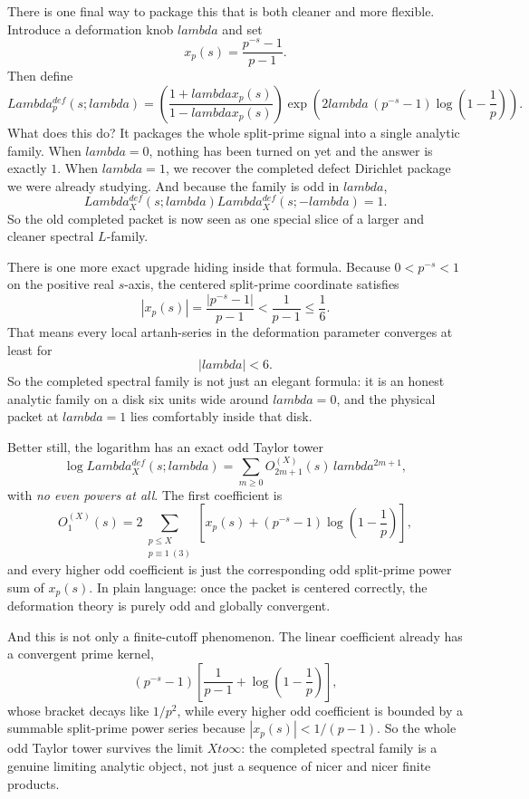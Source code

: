 \documentclass[11pt]{article}
\def\mathrm#1{#1}%
\def\mathcal#1{#1}%
\def\lambda{lambda}%
\def\Lambda{Lambda}%
\def\to{ to }%
\begin{document}
There is one final way to package this that is both cleaner and more flexible. Introduce a deformation knob $\lambda$ and set
\[
x_p(s)=\frac{p^{-s}-1}{p-1}.
\]
Then define
\[
\Lambda_p^{\mathrm{def}}(s;\lambda)
=
\left(\frac{1+\lambda x_p(s)}{1-\lambda x_p(s)}\right)
\exp\!\left(2\lambda\,(p^{-s}-1)\log\!\left(1-\frac1p\right)\right).
\]
What does this do? It packages the whole split-prime signal into a single analytic family. When $\lambda=0$, nothing has been turned on yet and the answer is exactly $1$. When $\lambda=1$, we recover the completed defect Dirichlet package we were already studying. And because the family is odd in $\lambda$,
\[
\Lambda_X^{\mathrm{def}}(s;\lambda)\Lambda_X^{\mathrm{def}}(s;-\lambda)=1.
\]
So the old completed packet is now seen as one special slice of a larger and cleaner spectral $L$-family.

There is one more exact upgrade hiding inside that formula. Because $0<p^{-s}<1$ on the positive real $s$-axis, the centered split-prime coordinate satisfies
\[
|x_p(s)|=\frac{|p^{-s}-1|}{p-1}<\frac{1}{p-1}\le\frac16.
\]
That means every local artanh-series in the deformation parameter converges at least for
\[
|\lambda|<6.
\]
So the completed spectral family is not just an elegant formula: it is an honest analytic family on a disk six units wide around $\lambda=0$, and the physical packet at $\lambda=1$ lies comfortably inside that disk.

Better still, the logarithm has an exact odd Taylor tower
\[
\log \Lambda_X^{\mathrm{def}}(s;\lambda)=\sum_{m\ge0}\mathcal O_{2m+1}^{(X)}(s)\,\lambda^{2m+1},
\]
with \emph{no even powers at all}. The first coefficient is
\[
\mathcal O_1^{(X)}(s)=2\sum_{\substack{p\le X\\ p\equiv1\ (3)}}
\left[x_p(s)+(p^{-s}-1)\log\!\left(1-\frac1p\right)\right],
\]
and every higher odd coefficient is just the corresponding odd split-prime power sum of $x_p(s)$. In plain language: once the packet is centered correctly, the deformation theory is purely odd and globally convergent.

And this is not only a finite-cutoff phenomenon. The linear coefficient already has a convergent prime kernel,
\[
(p^{-s}-1)\left[\frac{1}{p-1}+\log\!\left(1-\frac1p\right)\right],
\]
whose bracket decays like $1/p^2$, while every higher odd coefficient is bounded by a summable split-prime power series because $|x_p(s)|<1/(p-1)$. So the whole odd Taylor tower survives the limit $X\to\infty$: the completed spectral family is a genuine limiting analytic object, not just a sequence of nicer and nicer finite products.
\end{document}

